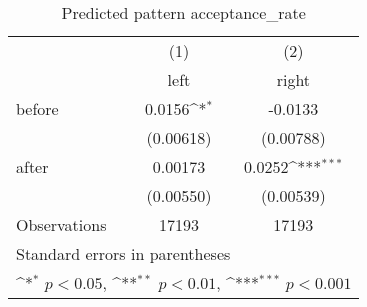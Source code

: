 \begin{table}[htbp]\centering
\def\sym#1{\ifmmode^{#1}\else\(^{#1}\)\fi}
\caption{Predicted pattern acceptance\_rate}
\begin{tabular}{l*{2}{c}}
\hline\hline
                    &\multicolumn{1}{c}{(1)}&\multicolumn{1}{c}{(2)}\\
                    &\multicolumn{1}{c}{left}&\multicolumn{1}{c}{right}\\
\hline
before              &      0.0156\sym{*}  &     -0.0133         \\
                    &   (0.00618)         &   (0.00788)         \\
[1em]
after               &     0.00173         &      0.0252\sym{***}\\
                    &   (0.00550)         &   (0.00539)         \\
\hline
Observations        &       17193         &       17193         \\
\hline\hline
\multicolumn{3}{l}{\footnotesize Standard errors in parentheses}\\
\multicolumn{3}{l}{\footnotesize \sym{*} \(p<0.05\), \sym{**} \(p<0.01\), \sym{***} \(p<0.001\)}\\
\end{tabular}
\end{table}
